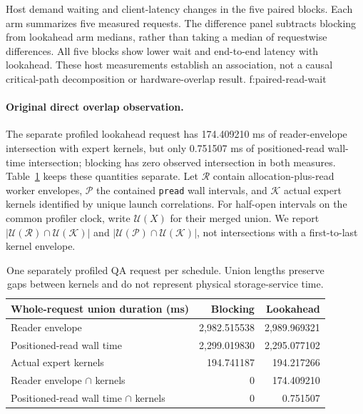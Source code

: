 {Host demand waiting and client-latency changes in the five paired blocks.
Each arm summarizes five measured requests. The difference panel subtracts
blocking from lookahead arm medians, rather than taking a median of
requestwise differences. All five blocks show lower wait and end-to-end
latency with lookahead. These host measurements establish an association,
not a causal critical-path decomposition or hardware-overlap result.}
{f:paired-read-wait}

\paragraph{Original direct overlap observation.}
The separate profiled lookahead request has 174.409210 ms of reader-envelope
intersection with expert kernels, but only 0.751507 ms of positioned-read
wall-time intersection; blocking has zero observed intersection in both
measures. Table~\ref{tab:overlap} keeps these quantities separate.
Let $\mathcal R$ contain allocation-plus-read worker envelopes, $\mathcal P$ the contained
\texttt{pread} wall intervals, and $\mathcal K$ actual expert kernels identified by
unique launch correlations. For half-open intervals on the common profiler
clock, write $\mathcal U(X)$ for their merged union. We report
$|\mathcal U(\mathcal R)\cap\mathcal U(\mathcal K)|$ and
$|\mathcal U(\mathcal P)\cap\mathcal U(\mathcal K)|$, not intersections with a first-to-last
kernel envelope.

\begin{table}[!htbp]
\centering
\small
\begin{tabularx}{\linewidth}{@{}>{\raggedright\arraybackslash}Xrr@{}}
\toprule
Whole-request union duration (ms) & Blocking & Lookahead \\
\midrule
Reader envelope & 2,982.515538 & 2,989.969321 \\
Positioned-read wall time & 2,299.019830 & 2,295.077102 \\
Actual expert kernels & 194.741187 & 194.217266 \\
Reader envelope $\cap$ kernels & 0 & 174.409210 \\
Positioned-read wall time $\cap$ kernels & 0 & 0.751507 \\
\bottomrule
\end{tabularx}
\caption{One separately profiled QA request per schedule. Union lengths
preserve gaps between kernels and do not represent physical storage-service time.}
\label{tab:overlap}
\end{table}

